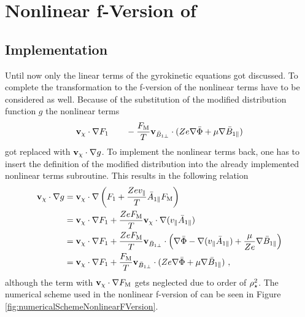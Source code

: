 \section{Nonlinear f-Version of {\gkw}}
\label{sec:simNonlinearFVersion}

\subsection{Implementation}
\label{sub:implementationNonlinearFVersion}

Until now only the linear terms of the gyrokinetic equations got discussed. To complete the transformation to the f-version of {\gkw} the nonlinear terms have to be considered as well. Because of the substitution of the modified distribution function $g$ the nonlinear terms 
\begin{gather*}
    \boldsymbol{\mathbf{v}}_\chi \cdot \nabla F_1 \qquad -\frac{F_\mathrm{M}}{T} \boldsymbol{\mathbf{v}}_{\bar{B}_{1\perp}} \cdot (Z e \nabla \bar{\Phi} + \mu \nabla \bar{B}_{1\parallel})
    \label{eq:nonlinearTermsFVersion}
\end{gather*}
got replaced with $\boldsymbol{\mathbf{v}}_\chi \cdot \nabla g$. To implement the nonlinear terms back, one has to insert the definition of the modified distribution into the already implemented nonlinear terms subroutine. This results in the following relation
\begin{gather}
    \begin{aligned}
        \boldsymbol{\mathbf{v}}_\chi \cdot \nabla g &= \boldsymbol{\mathbf{v}}_\chi \cdot \nabla \left(F_1 + \frac{Ze v_\parallel}{T} \bar{A}_{1\parallel} F_\mathrm{M}\right) \\
                             &= \boldsymbol{\mathbf{v}}_\chi \cdot \nabla F_1 + \frac{Ze F_\mathrm{M}}{T} \boldsymbol{\mathbf{v}}_\chi \cdot \nabla (v_\parallel\bar{A}_{1\parallel}) \\
                             &= \boldsymbol{\mathbf{v}}_\chi \cdot \nabla F_1 + \frac{Ze F_\mathrm{M}}{T} \boldsymbol{\mathbf{v}}_{\bar{B}_{1\perp}} \cdot \left( \nabla \bar{\Phi} - \nabla (v_\parallel \bar{A}_{1\parallel}) + \frac{\mu}{Ze} \nabla \bar{B}_{1\parallel} \right) \\
                             &= \boldsymbol{\mathbf{v}}_\chi \cdot \nabla F_1 + \frac{F_\mathrm{M}}{T} \boldsymbol{\mathbf{v}}_{\bar{B}_{1\perp}} \cdot ( Ze \nabla \bar{\Phi} + \mu \nabla \bar{B}_{1\parallel}) ~,
    \end{aligned}
    \label{eq:nonlinearTermsGVersionToFVersion}
\end{gather}
although the term with $\boldsymbol{\mathbf{v}}_\chi \cdot \nabla F_\mathrm{M}$ gets neglected due to order of $\rho_\star^2$. The numerical scheme used in the nonlinear f-version of {\gkw} can be seen in Figure \ref{fig:numericalSchemeNonlinearFVersion}. 

\newpage

